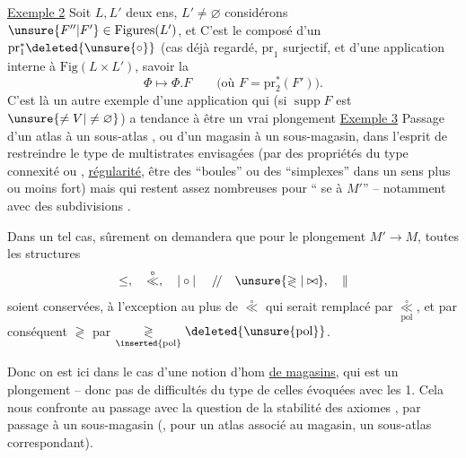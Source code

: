 \uline{Exemple 2} Soit $L,L'$ deux ens, $L'\ne\varnothing$ considérons $\unsure{F''|F'}\in\mathrm{Figures}(L')$,  et
C'est le composé d'un $\mathrm{pr}_1^*\deleted{\unsure{\circ}}$ (cas déjà regardé, $\mathrm{pr}_1$ surjectif, et d'une application interne à $\mathrm{Fig}(L\times L')$, savoir la
\[
\Phi\longmapsto\Phi.F\qquad\text{(où }F=\mathrm{pr}_2^*(F')\text{)}.
\]
C'est là un autre exemple d'une application qui (si $\operatorname{supp}F$ est $\unsure{\ne V|\ne\varnothing}$) a tendance à être un vrai plongement 
\uline{Exemple 3} Passage d'un atlas  à un sous-atlas , ou d'un magasin à un sous-magasin, dans l'esprit de restreindre le type de multistrates envisagées (par des propriétés du type connexité ou , \uline{régularité}, être  des ``boules'' ou des ``simplexes'' dans un sens plus ou moins fort) mais qui restent assez nombreuses pour `` se  à $M'$'' -- notamment avec des subdivisions .

Dans un tel cas, sûrement on demandera que pour le plongement $M'\longrightarrow M$, toutes les structures
\[
\leq,\quad\overset{\circ}{\ll},\quad\mathrel{|\circ|}\quad/\!/\quad\unsure{\gtrless|\bowtie},\quad\parallel
\]
soient conservées, à l'exception  au plus de $\overset{\circ}{\ll}$ qui serait remplacé par $\underset{\mathrm{pol}}{\overset{\circ}{\ll}}$, et par conséquent $\gtrless$ par $\underset{\inserted{\mathrm{pol}}}{\gtrless}\deleted{\unsure{\mathrm{pol}}}$.

Donc on est ici dans le cas d'une notion d'hom \uline{de magasins}, qui est un plongement -- donc pas de difficultés du type de celles évoquées avec les  1.
Cela nous confronte au passage avec la question de la stabilité des axiomes , par passage à un sous-magasin (, pour un atlas associé au magasin, un sous-atlas correspondant).

